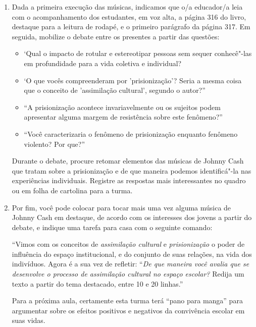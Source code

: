 \documentclass[11pt]{extarticle}
\begin{document}
\begin{enumerate}
\item Dada a primeira execução das músicas, indicamos que o/a educador/a leia
com o acompanhamento dos estudantes, em voz alta, a página 316 do livro, destaque para a leitura de rodapé, e o primeiro
parágrafo da página 317. Em seguida, mobilize o debate entre os
presentes a partir das questões:

\begin{itemize}
\item `Qual o impacto de rotular e
estereotipar pessoas sem sequer conhecê"-las em profundidade para a vida
coletiva e individual?

\item`O que vocês compreenderam por
'prisionização'? Seria a mesma coisa que o conceito de 'assimilação
cultural', segundo o autor?''

\item ``A prisionização acontece invariavelmente ou
os sujeitos podem apresentar alguma margem de resistência sobre este
fenômeno?''

\item ``Você caracterizaria o fenômeno de prisionização enquanto
fenômeno violento? Por que?''
\end{itemize}

Durante o debate, procure retomar elementos das músicas de Johnny Cash
que tratam sobre a prisionização e de que maneira podemos identificá"-la
nas experiências individuais. Registre as respostas mais interessantes
no quadro ou em folha de cartolina para a turma.

\item Por fim, você pode colocar para tocar mais uma vez alguma música de
Johnny Cash em destaque, de acordo com os interesses dos jovens a partir
do debate, e indique uma tarefa para casa com o seguinte comando:

``Vimos com os conceitos de \emph{assimilação cultural} e \emph{prisionização} o
poder de influência do espaço institucional, e do conjunto de suas
relações, na vida dos indivíduos. Agora é a sua vez de refletir: ``\emph{De que
maneira você avalia que se desenvolve o processo de assimilação cultural
no espaço escolar?} Redija um texto a partir do tema destacado, entre 10
e 20 linhas.''

Para a próxima aula, certamente esta turma terá ``pano para manga'' para
argumentar sobre os efeitos positivos e negativos da convivência escolar
em suas vidas.
\end{enumerate}
\end{document}
